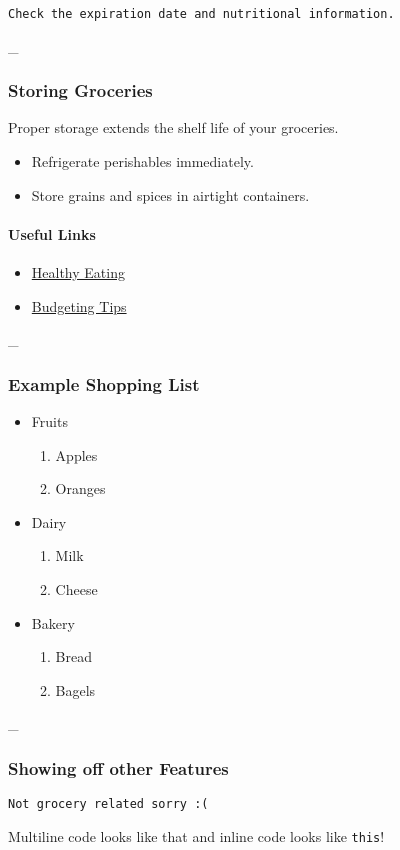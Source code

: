 \documentclass{article}
\begin{document}
\begin{verbatim}
Check the expiration date and nutritional information.
\end{verbatim}


\_\hrulefill


\subsubsection{Storing Groceries}


Proper storage extends the shelf life of your groceries.


\begin{itemize}
    \item Refrigerate perishables immediately.
    \item Store grains and spices in airtight containers.
\end{itemize}


\paragraph{Useful Links}


\begin{itemize}
    \item \href{https://www.healthyeating.org/}{Healthy Eating}
    \item \href{https://www.budgeting101$\backslash$.com/}{Budgeting Tips}
\end{itemize}


\_\hrulefill


\subsubsection{Example Shopping List}


\begin{itemize}
    \item Fruits
\begin{enumerate}
    \item Apples
    \item Oranges
\end{enumerate}
    \item Dairy
\begin{enumerate}
    \item Milk
    \item Cheese
\end{enumerate}
    \item Bakery
\begin{enumerate}
    \item Bread
    \item Bagels
\end{enumerate}
\end{itemize}


\_\hrulefill


\subsubsection{Showing off other Features}

\begin{verbatim}
Not grocery related sorry :(
\end{verbatim}


Multiline code looks like that and inline code looks like \texttt{this}!
\end{document}

